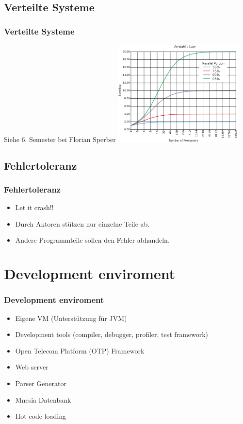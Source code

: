 \documentclass{beamer}
\begin{document}
\subsection{Verteilte Systeme}
\begin{frame} %
  \frametitle{Verteilte Systeme} %
    Siehe 6. Semester bei Florian Sperber
    \includegraphics[width=250px]{img/amdahl}
\end{frame}

\subsection{Fehlertoleranz}
\begin{frame} %
  \frametitle{Fehlertoleranz} %
  \begin{itemize} %
    \item Let it crash!!
    \item Durch Aktoren stützen nur einzelne Teile ab.
    \item Andere Programmteile sollen den Fehler abhandeln.
  \end{itemize}
\end{frame}

\section{Development enviroment}
\begin{frame} %
  \frametitle{Development enviroment} %
  \begin{itemize} %
    \item Eigene VM (Unterstützung für JVM)
    \item Development tools (compiler, debugger, profiler, test framework)
    \item Open Telecom Platform (OTP) Framework
    \item Web server
    \item Parser Generator
    \item Mnesia Datenbank
    \item Hot code loading
  \end{itemize}
\end{frame}
\end{document}
